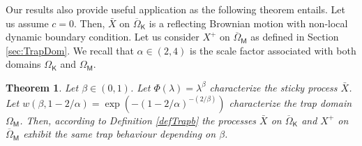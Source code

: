 \documentclass[[11pt,a4paper,reqno]{article}
\newtheorem{theorem}{Theorem}[section]
\numberwithin{equation}{section}
\begin{document}
Our results also provide useful application as the following theorem entails. Let us assume $c=0$. Then, $\bar{X}$ on $\overline{\Omega}_\mathsf{K}$ is a reflecting Brownian motion with non-local dynamic boundary condition. Let us consider $X^+$ on $\overline{\Omega}_\mathsf{M}$ as defined in Section \ref{sec:TrapDom}. We recall that $\alpha \in (2,4)$ is the scale factor associated with both domains $\Omega_\mathsf{K}$ and $\Omega_\mathsf{M}$.\\


\begin{theorem}
Let $\beta \in (0,1)$. Let $\Phi(\lambda) = \lambda^{\beta}$ characterize the sticky process $\bar{X}$. Let $w(\beta, 1-2/\alpha) = \exp(-(1-2/\alpha)^{-(2/\beta)})$ characterize the trap domain $\Omega_\mathsf{M}$. Then, according to Definition \ref{defTrapb}  the processes $\bar{X}$ on $\overline{\Omega}_\mathsf{K}$ and $X^+$ on $\overline{\Omega}_\mathsf{M}$ exhibit the same trap behaviour depending on $\beta$. 
\end{theorem}
\end{document}
